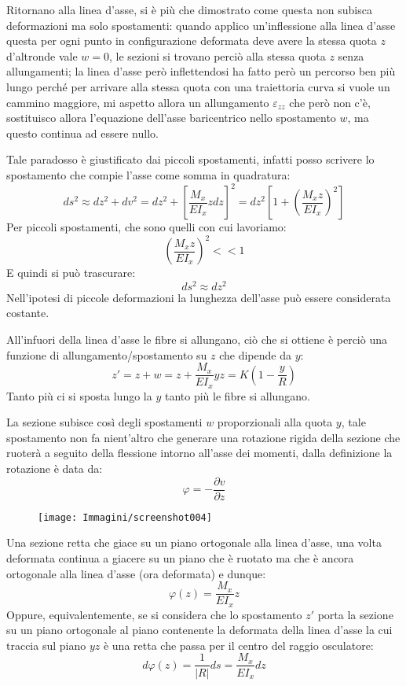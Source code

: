 \documentclass{article}
\begin{document}
\begin{adjustwidth}{2in}{}
		Ritornano alla linea d'asse, si è più che dimostrato come questa non subisca deformazioni ma solo spostamenti: quando applico un'inflessione alla linea d'asse questa per ogni punto in configurazione deformata deve avere la stessa quota $z$ d'altronde vale $w=0$, le sezioni si trovano perciò alla stessa quota $z$ senza allungamenti; la linea d'asse però inflettendosi ha fatto però un percorso ben più lungo perché per arrivare alla stessa quota con una traiettoria curva si vuole un cammino maggiore, mi aspetto allora un allungamento $\varepsilon_{zz}$ che però non c'è, sostituisco allora l'equazione dell'asse baricentrico nello spostamento $w$, ma questo continua ad essere nullo. \newline 
		
		Tale paradosso è giustificato dai piccoli spostamenti, infatti posso scrivere lo spostamento che compie l'asse come somma in quadratura:
		\[ ds^2 \approx dz^2 + dv^2 = dz^2 + \left[\dfrac{M_x}{EI_x}zdz\right]^2 = dz^2 \left[1+ \left(\dfrac{M_xz}{EI_x}\right)^2\right] \]
		Per piccoli spostamenti, che sono quelli con cui lavoriamo:
		\[\left(\dfrac{M_xz}{EI_x}\right)^2 << 1\]
		E quindi si può trascurare:
		\[  ds^2 \approx dz^2 \]
		Nell’ipotesi di piccole deformazioni la lunghezza dell’asse può essere considerata costante. \newline
		
		All'infuori della linea d'asse le fibre si allungano, ciò che si ottiene è perciò una funzione di allungamento/spostamento su $z$ che dipende da $y$:
		\[ z' = z + w = z + \dfrac{M_x}{EI_x}yz = K \left(1-\dfrac{y}{R}\right)\]
		Tanto più ci si sposta lungo la $y$ tanto più le fibre si allungano. 
		
		La sezione subisce così degli spostamenti $w$ proporzionali alla quota $y$, tale spostamento non fa nient'altro che generare una rotazione rigida della sezione che ruoterà a seguito della flessione intorno all'asse dei momenti, dalla definizione la rotazione è data da: 
		\[  \varphi = -\dfrac{ \partial v}{ \partial z}\]
		
\begin{figure}[H]
	\centering
	\texttt{[image: Immagini/screenshot004]}
	\label{fig:screenshot004}
\end{figure}


		Una sezione retta che giace su un piano ortogonale alla linea d’asse, una volta deformata
		continua a giacere su un piano che è ruotato ma che è ancora ortogonale alla linea d’asse (ora
		deformata) e dunque: 
		\[ \varphi(z) = \dfrac{M_x}{EI_x}z \]
		Oppure, equivalentemente, se si considera che lo spostamento $z'$ porta la sezione su un piano ortogonale al piano contenente la deformata della linea d’asse
		la cui traccia sul piano $ yz $ è una retta che passa per il centro del raggio osculatore:
		\[ d\varphi(z) = \dfrac{1}{|R|}ds = \dfrac{M_x}{EI_x}dz \]
		

\end{adjustwidth}
\end{document}

